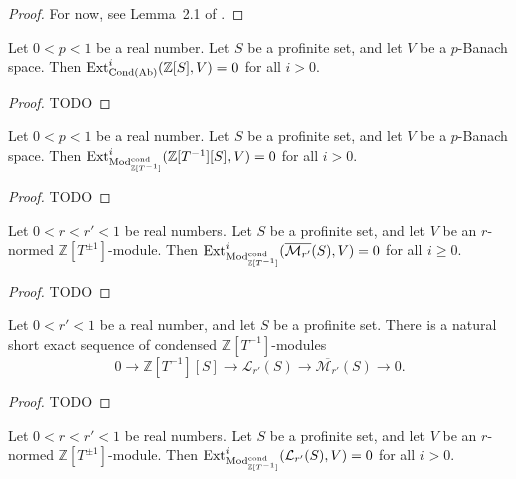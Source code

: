 \begin{proof}
  For now, see Lemma~2.1 of \cite{Analytic}.
\end{proof}

\begin{lemma}
  \label{Ext-free}
  Let $0 < p < 1$ be a real number.
  Let $S$ be a profinite set, and let $V$ be a $p$-Banach space.
  Then $\operatorname{Ext}_{\operatorname{Cond}(\operatorname{Ab})}^i(\mathbb Z[S], V) = 0$ for all $i > 0$.
\end{lemma}

\begin{proof}
  TODO
\end{proof}

\begin{lemma}
  \label{Ext-free}
  Let $0 < p < 1$ be a real number.
  Let $S$ be a profinite set, and let $V$ be a $p$-Banach space.
  Then $\operatorname{Ext}_{\mathrm{Mod}^{\mathrm{cond}}_{\mathbb Z[T^{-1}]}}^i(\mathbb Z[T^{-1}][S], V) = 0$ for all $i > 0$.
\end{lemma}

\begin{proof}
  TODO
\end{proof}

\begin{lemma}
  \label{Ext-Lbar}
  Let $0 < r < r' < 1$ be real numbers.
  Let $S$ be a profinite set, and let $V$ be an $r$-normed $\mathbb Z[T^{\pm1}]$-module.
  Then $\operatorname{Ext}_{\mathrm{Mod}^{\mathrm{cond}}_{\mathbb Z[T^{-1}]}}^i(\overline{\mathcal M_{r'}}(S), V) = 0$ for all $i \ge 0$.
\end{lemma}

\begin{proof}
  TODO
\end{proof}

\begin{lemma}
  \label{Lbar-ses}
  Let $0 < r' < 1$ be a real number, and let $S$ be a profinite set.
  There is a natural short exact sequence of condensed $\mathbb Z[T^{-1}]$-modules
  \[
    0 \to \mathbb Z[T^{-1}][S] \to \mathcal L_{r'}(S) \to \overline{\mathcal{M}_{r'}}(S) \to 0.
  \]
\end{lemma}

\begin{proof}
  TODO
\end{proof}

\begin{lemma}
  \label{Ext-L}
  Let $0 < r < r' < 1$ be real numbers.
  Let $S$ be a profinite set, and let $V$ be an $r$-normed $\mathbb Z[T^{\pm1}]$-module.
  Then $\operatorname{Ext}_{\mathrm{Mod}^{\mathrm{cond}}_{\mathbb Z[T^{-1}]}}^i(\mathcal L_{r'}(S), V) = 0$ for all $i > 0$.
\end{lemma}

